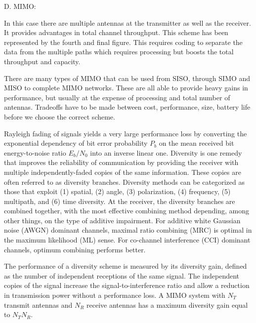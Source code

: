 D. MIMO:

In this case there are multiple antennas at the transmitter as well as the receiver. It provides advantages in total channel throughput. This scheme has been represented by the fourth and final figure. This requires coding to separate the data from the multiple paths which requires processing but boosts the total throughput and capacity.

There are many types of MIMO that can be used from SISO, through SIMO and MISO to complete MIMO networks. These are all able to provide heavy gains in performance, but usually at the expense of processing and total number of antennas. Tradeoffs have to be made between cost, performance, size, battery life before we choose the correct scheme.


Rayleigh fading of signals yields a very large performance loss by converting the exponential dependency of bit error probability $P_b$ on the mean received bit energy-to-noise ratio $E_b/N_0$ into an inverse linear one. Diversity is one remedy that improves the reliability of communication by providing the receiver with multiple independently-faded copies of the same information. These copies are often referred to as diversity branches. Diversity methods can be categorized as those that exploit (1) spatial, (2) angle, (3) polarization, (4) frequency, (5) multipath, and (6) time diversity. At the receiver, the diversity branches are combined together, with the most effective combining method depending, among other things, on the type of additive impairment. For additive white Gaussian noise (AWGN) dominant channels, maximal ratio combining (MRC) is optimal in the maximum likelihood (ML) sense. For co-channel interference (CCI) dominant channels, optimum combining performs better.

The performance of a diversity scheme is measured by its diversity gain, defined as the number of independent receptions of the same signal. The independent copies of the signal increase the signal-to-interference ratio and allow a reduction in transmission power without a performance loss. A MIMO system with $N_T$ transmit antennas and $N_R$ receive antennas has a maximum diversity gain equal to $N_TN_R$.
